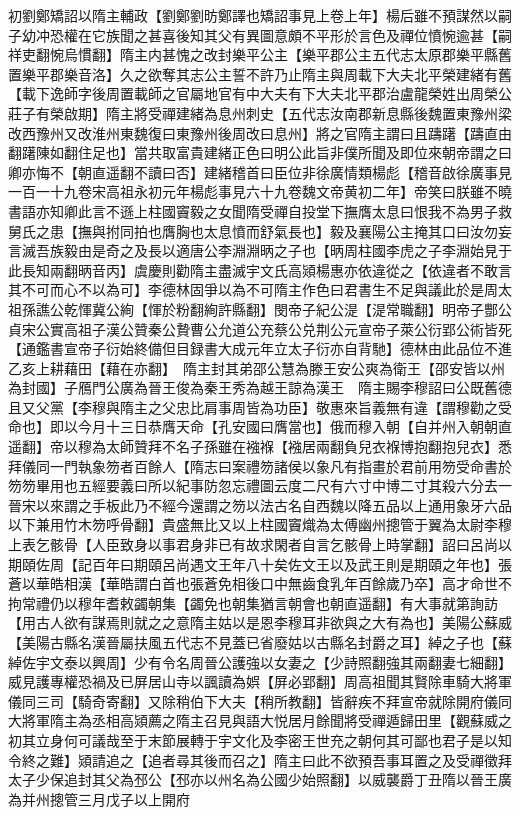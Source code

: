 初劉鄭矯詔以隋主輔政【劉鄭劉昉鄭譯也矯詔事見上卷上年】楊后雖不預謀然以嗣子幼冲恐權在它族聞之甚喜後知其父有異圖意頗不平形於言色及禪位憤惋逾甚【嗣祥吏翻惋烏慣翻】隋主内甚愧之改封樂平公主【樂平郡公主五代志太原郡樂平縣舊置樂平郡樂音洛】久之欲奪其志公主誓不許乃止隋主與周載下大夫北平榮建緒有舊【載下逸師字後周置載師之官屬地官有中大夫有下大夫北平郡治盧龍榮姓出周榮公莊子有榮啟期】隋主將受禪建緒為息州刺史【五代志汝南郡新息縣後魏置東豫州梁改西豫州又改淮州東魏復曰東豫州後周改曰息州】將之官隋主謂曰且躊躇【躊直由翻躇陳如翻住足也】當共取富貴建緒正色曰明公此旨非僕所聞及即位來朝帝謂之曰卿亦悔不【朝直遥翻不讀曰否】建緒稽首曰臣位非徐廣情類楊彪【稽音啟徐廣事見一百一十九卷宋高祖永初元年楊彪事見六十九卷魏文帝黄初二年】帝笑曰朕雖不曉書語亦知卿此言不遜上柱國竇毅之女聞隋受禪自投堂下撫膺太息曰恨我不為男子救舅氏之患【撫與拊同拍也膺胸也太息憤而舒氣長也】毅及襄陽公主掩其口曰汝勿妄言滅吾族毅由是奇之及長以適唐公李淵淵昞之子也【昞周柱國李虎之子李淵始見于此長知兩翻昞音丙】虞慶則勸隋主盡滅宇文氏高熲楊惠亦依違從之【依違者不敢言其不可而心不以為可】李德林固爭以為不可隋主作色曰君書生不足與議此於是周太祖孫譙公乾惲冀公絢【惲於粉翻絢許縣翻】閔帝子紀公湜【湜常職翻】明帝子酆公貞宋公實高祖子漢公贊秦公贄曹公允道公充蔡公兑荆公元宣帝子萊公衍郢公術皆死【通鑑書宣帝子衍始終備但目録書大成元年立太子衍亦自背馳】德林由此品位不進　乙亥上耕藉田【藉在亦翻】　隋主封其弟邵公慧為滕王安公爽為衛王【邵安皆以州為封國】子鴈門公廣為晉王俊為秦王秀為越王諒為漢王　隋主賜李穆詔曰公既舊德且又父黨【李穆與隋主之父忠比肩事周皆為功臣】敬惠來旨義無有違【謂穆勸之受命也】即以今月十三日恭膺天命【孔安國曰膺當也】俄而穆入朝【自并州入朝朝直遥翻】帝以穆為太師贊拜不名子孫雖在襁褓【襁居兩翻負兒衣褓博抱翻抱兒衣】悉拜儀同一門執象笏者百餘人【隋志曰案禮笏諸侯以象凡有指畫於君前用笏受命書於笏笏畢用也五經要義曰所以紀事防忽忘禮圖云度二尺有六寸中博二寸其殺六分去一晉宋以來謂之手板此乃不經今還謂之笏以法古名自西魏以降五品以上通用象牙六品以下兼用竹木笏呼骨翻】貴盛無比又以上柱國竇熾為太傅幽州摠管于翼為太尉李穆上表乞骸骨【人臣致身以事君身非已有故求閑者自言乞骸骨上時掌翻】詔曰呂尚以期頤佐周【記百年曰期頤呂尚遇文王年八十矣佐文王以及武王則是期頤之年也】張蒼以華皓相漢【華皓謂白首也張蒼免相後口中無齒食乳年百餘歲乃卒】高才命世不拘常禮仍以穆年耆敕蠲朝集【蠲免也朝集猶言朝會也朝直遥翻】有大事就第詢訪【用古人欲有謀焉則就之之意隋主姑以是恩李穆耳非欲與之大有為也】美陽公蘇威【美陽古縣名漢晉屬扶風五代志不見蓋已省廢姑以古縣名封爵之耳】綽之子也【蘇綽佐宇文泰以興周】少有令名周晉公護強以女妻之【少詩照翻強其兩翻妻七細翻】威見護專權恐禍及已屏居山寺以諷讀為娯【屏必郢翻】周高祖聞其賢除車騎大將軍儀同三司【騎奇寄翻】又除稍伯下大夫【稍所教翻】皆辭疾不拜宣帝就除開府儀同大將軍隋主為丞相高熲薦之隋主召見與語大悦居月餘聞將受禪遁歸田里【觀蘇威之初其立身何可議哉至于末節展轉于宇文化及李密王世充之朝何其可鄙也君子是以知令終之難】熲請追之【追者尋其後而召之】隋主曰此不欲預吾事耳置之及受禪徵拜太子少保追封其父為邳公【邳亦以州名為公國少始照翻】以威襲爵丁丑隋以晉王廣為并州摠管三月戊子以上開府

